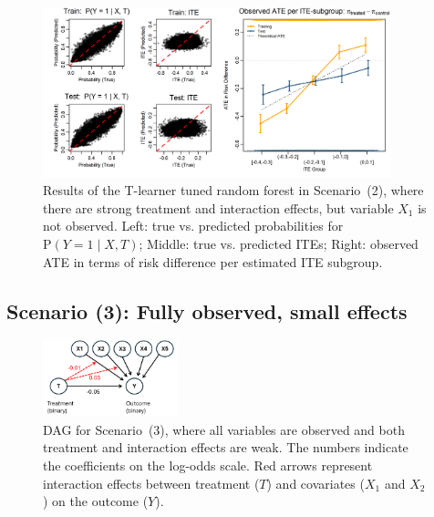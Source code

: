 \begin{figure}[htbp]
\centering
\includegraphics[width=0.9\textwidth]{img/results_ITE_simulation/unobserved_interaction_tuned_rf_tlearner.png}
\caption{Results of the T-learner tuned random forest in Scenario~(2), where there are strong treatment and interaction effects, but variable $X_1$ is not observed. Left: true vs. predicted probabilities for $\text{P}(Y = 1 \mid X, T)$; Middle: true vs. predicted ITEs; Right: observed ATE in terms of risk difference per estimated ITE subgroup.}
\label{fig:unobserved_interaction_tuned_rf_tlearner}
\end{figure}


\clearpage

\subsection{Scenario (3): Fully observed, small effects}

\begin{figure}[htbp]
\centering
\includegraphics[width=0.35\textwidth]{img/results_ITE_simulation/simulation_small_effects.png}
\caption{DAG for Scenario~(3), where all variables are observed and both treatment and interaction effects are weak. The numbers indicate the coefficients on the log-odds scale. Red arrows represent interaction effects between treatment ($T$) and covariates ($X_1$ and $X_2$) on the outcome ($Y$).}
\label{fig:small_interaction_dag}
\end{figure}




